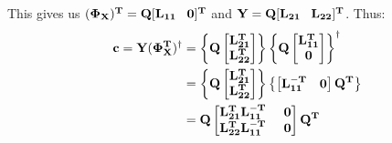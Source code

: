 \documentclass{article}
\begin{document}
This gives us $\bf (\Phi_X)^T = Q [ L_{11} \;\;\; 0 ]^T $ and $\bf Y = Q [ L_{21} \;\;\; L_{22} ]^T  $. Thus:
\begin{equation}
\begin{aligned}
\bf c = Y (\Phi_{X}^T)^{\dagger} &= \left \lbrace \bf Q
\begin{bmatrix}
\bf L_{21}^T \\
\bf L_{22}^T
\end{bmatrix} \right \rbrace
\left \lbrace \bf Q
\begin{bmatrix}
\bf L_{11}^T \\
\bf 0
\end{bmatrix} \right \rbrace ^{\dagger} \\
& = 
\left \lbrace \bf Q
\begin{bmatrix}
\bf L_{21}^T \\
\bf L_{22}^T
\end{bmatrix} \right \rbrace
\left \lbrace
\begin{bmatrix}
\bf L_{11}^{-T} & \bf 0
\end{bmatrix} \bf Q^T
\right \rbrace \\
& = 
\bf Q 
\begin{bmatrix}
\bf L_{21}^T L_{11}^{-T} \;\;\;\;\; 0 \\
\bf L_{22}^T L_{11}^{-T} \;\;\;\;\; 0
\end{bmatrix} \bf Q^T
\end{aligned}
\end{equation}
\end{document}

